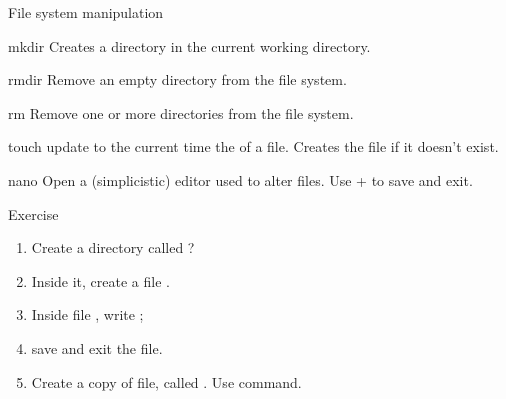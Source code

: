 \begin{frame}{File system manipulation}

	\begin{block}{mkdir}
		Creates a directory in the current working directory.
	\end{block}
	
	\begin{block}{rmdir}
		Remove an empty directory from the file system.
	\end{block}
	
	\begin{block}{rm}
		Remove one or more directories from the file system.
	\end{block}
	
	\begin{block}{touch}
		update to the current time the  of a file. Creates the file if it doesn't exist.
	\end{block}
	
	\begin{block}{nano}
		Open a (simplicistic) editor used to alter files. Use  +  to save and exit.
	\end{block}

\end{frame}

\begin{frame}{Exercise}

	\begin{enumerate}
		\item<1-> Create a directory called ?
		\item<2-> Inside it, create a file .
		\item<3-> Inside file , write ;
		\item<4-> save and exit the file.
		\item<3-> Create a copy of  file, called . Use  command.
	\end{enumerate}
	
\end{frame}

